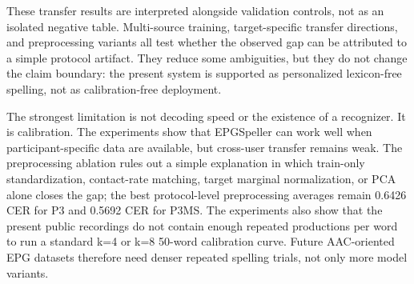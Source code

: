 These transfer results are interpreted alongside validation controls, not as an isolated negative table. Multi-source training, target-specific transfer directions, and preprocessing variants all test whether the observed gap can be attributed to a simple protocol artifact. They reduce some ambiguities, but they do not change the claim boundary: the present system is supported as personalized lexicon-free spelling, not as calibration-free deployment.


The strongest limitation is not decoding speed or the existence of a recognizer. It is calibration. The experiments show that EPGSpeller can work well when participant-specific data are available, but cross-user transfer remains weak. The preprocessing ablation rules out a simple explanation in which train-only standardization, contact-rate matching, target marginal normalization, or PCA alone closes the gap; the best protocol-level preprocessing averages remain 0.6426 CER for P3 and 0.5692 CER for P3MS. The experiments also show that the present public recordings do not contain enough repeated productions per word to run a standard k=4 or k=8 50-word calibration curve. Future AAC-oriented EPG datasets therefore need denser repeated spelling trials, not only more model variants.

